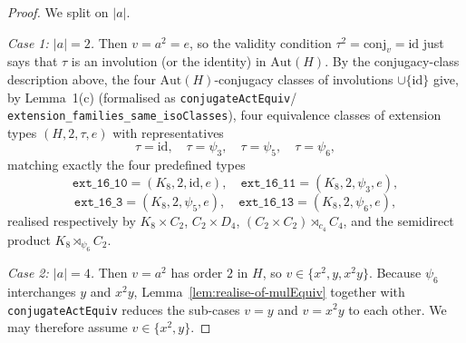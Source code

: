 \begin{proof}
  \smallskip
  We split on $|a|$.

  \smallskip
  \noindent
  \emph{Case 1: $|a| = 2$.} Then $v = a^2 = e$, so the validity condition
  $\tau^2 = \mathrm{conj}_v = \mathrm{id}$ just says that $\tau$ is an
  involution (or the identity) in $\mathrm{Aut}(H)$. By the conjugacy-class
  description above, the four
  $\mathrm{Aut}(H)$-conjugacy classes of involutions $\cup \{\mathrm{id}\}$
  give, by Lemma~1(c) (formalised as \texttt{conjugateActEquiv}/
  \texttt{extension\_families\_same\_isoClasses}), four equivalence classes
  of extension types $(H, 2, \tau, e)$ with representatives
  \[
    \tau = \mathrm{id},\quad \tau = \psi_3,\quad \tau = \psi_5,\quad \tau =
    \psi_6,
  \]
  matching exactly the four predefined types
  \[
    \mathtt{ext\_16\_10} = (K_8, 2, \mathrm{id}, e),\quad
    \mathtt{ext\_16\_11} = (K_8, 2, \psi_3, e),
  \]
  \[
    \mathtt{ext\_16\_3} = (K_8, 2, \psi_5, e),\quad
    \mathtt{ext\_16\_13} = (K_8, 2, \psi_6, e),
  \]
  realised respectively by $K_8 \times C_2$, $C_2 \times D_4$,
  $(C_2 \times C_2) \rtimes_{c_4} C_4$, and the semidirect product
  $K_8 \rtimes_{\psi_6} C_2$.

  \smallskip
  \noindent
  \emph{Case 2: $|a| = 4$.} Then $v = a^2$ has order $2$ in $H$, so
  $v \in \{x^2, y, x^2 y\}$. Because $\psi_6$ interchanges $y$ and $x^2 y$,
  Lemma~\ref{lem:realise-of-mulEquiv} together with
  \texttt{conjugateActEquiv} reduces the sub-cases $v = y$ and $v = x^2 y$ to
  each other. We may therefore assume $v \in \{x^2, y\}$.


\end{proof}
